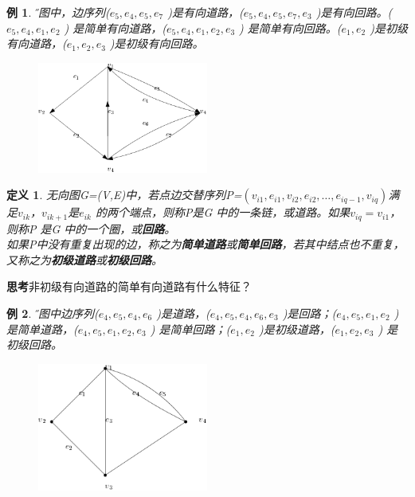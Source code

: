 \documentclass[11pt,a4paper,openany]{book}
\newtheorem{defination}{\textbf{定义}}[section]
\newtheorem{sample}{\textbf{例}}[section]
\begin{document}
\begin{sample}\H 下图中，边序列($e_5,e_4,e_5,e_7$ )是有向道路，($e_5,e_4,e_5,e_7,e_3$ )是有向回路。($e_5,e_4,e_1,e_2$ ) 是简单有向道路，($e_5,e_4,e_1,e_2,e_3$ ) 是简单有向回路。($e_1,e_2$ )是初级有向道路，($e_1,e_2,e_3$ )是初级有向回路。
\begin{figure}[H]
  \centering
  \includegraphics[width=0.5\textwidth]{2.1.png}\\
\caption{}\label{fig:2.1}
\end{figure}
\end{sample}
\begin{defination}\K
无向图G=(V,E)中，若点边交替序列P=$(v_{i1},e_{i1},v_{i2},e_{i2},\dots,e_{iq-1},v_{iq} )$满足$v_{ik}$，$v_{ik+1}$是$e_{ik}$ 的两个端点，则称P是G 中的一条链，或道路。如果$v_{iq}=v_{i1}$，则称P 是G 中的一个圈，或\textbf{回路}。\\
如果P中没有重复出现的边，称之为\textbf{简单道路}或\textbf{简单回路}，若其中结点也不重复，又称之为\textbf{初级道路}或\textbf{初级回路}。
\end{defination}
\textbf{思考}非初级有向道路的简单有向道路有什么特征？
\begin{sample}\H
下图中边序列($e_4,e_5,e_4,e_6$ )是道路，($e_4,e_5,e_4,e_6,e_3$ )是回路；($e_4,e_5,e_1,e_2$ )是简单道路，($e_4,e_5,e_1,e_2,e_3$ ) 是简单回路；($e_1,e_2$ )是初级道路，($e_1,e_2,e_3$ ) 是初级回路。
\begin{figure}[H]
  \centering
  \includegraphics[width=0.5\textwidth]{2.2.png}\\
\caption{}\label{fig:2.2}
\end{figure}
\end{sample}
\end{document}
